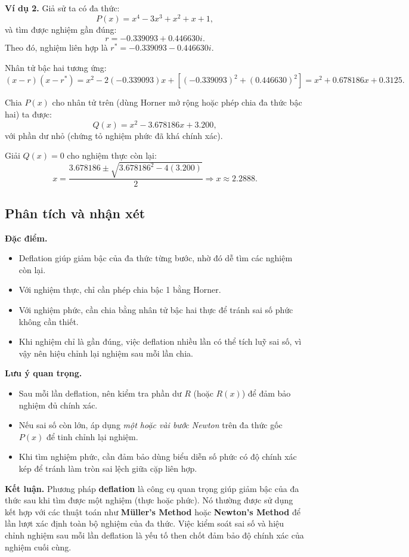 \textbf{Ví dụ 2.}  
Giả sử ta có đa thức:
\[
P(x) = x^4 - 3x^3 + x^2 + x + 1,
\]
và tìm được nghiệm gần đúng:
\[
r = -0.339093 + 0.446630i.
\]
Theo đó, nghiệm liên hợp là $r^* = -0.339093 - 0.446630i$.

Nhân tử bậc hai tương ứng:
\[
(x - r)(x - r^*) = x^2 - 2(-0.339093)x + [(-0.339093)^2 + (0.446630)^2] = x^2 + 0.678186x + 0.3125.
\]

Chia $P(x)$ cho nhân tử trên (dùng Horner mở rộng hoặc phép chia đa thức bậc hai) ta được:
\[
Q(x) = x^2 - 3.678186x + 3.200,
\]
với phần dư nhỏ (chứng tỏ nghiệm phức đã khá chính xác).

Giải $Q(x) = 0$ cho nghiệm thực còn lại:
\[
x = \frac{3.678186 \pm \sqrt{3.678186^2 - 4(3.200)}}{2} \Rightarrow x \approx 2.2888.
\]

\subsection{Phân tích và nhận xét}

\textbf{Đặc điểm.}
\begin{itemize}
    \item Deflation giúp giảm bậc của đa thức từng bước, nhờ đó dễ tìm các nghiệm còn lại.
    \item Với nghiệm thực, chỉ cần phép chia bậc 1 bằng Horner.
    \item Với nghiệm phức, cần chia bằng nhân tử bậc hai thực để tránh sai số phức không cần thiết.
    \item Khi nghiệm chỉ là gần đúng, việc deflation nhiều lần có thể tích luỹ sai số, vì vậy nên hiệu chỉnh lại nghiệm sau mỗi lần chia.
\end{itemize}

\textbf{Lưu ý quan trọng.}
\begin{itemize}
    \item Sau mỗi lần deflation, nên kiểm tra phần dư $R$ (hoặc $R(x)$) để đảm bảo nghiệm đủ chính xác.
    \item Nếu sai số còn lớn, áp dụng \textit{một hoặc vài bước Newton} trên đa thức gốc $P(x)$ để tinh chỉnh lại nghiệm.
    \item Khi tìm nghiệm phức, cần đảm bảo dùng biểu diễn số phức có độ chính xác kép để tránh làm tròn sai lệch giữa cặp liên hợp.
\end{itemize}

\textbf{Kết luận.}  
Phương pháp \textbf{deflation} là công cụ quan trọng giúp giảm bậc của đa thức sau khi tìm được một nghiệm (thực hoặc phức).  
Nó thường được sử dụng kết hợp với các thuật toán như \textbf{Müller’s Method} hoặc \textbf{Newton’s Method} để lần lượt xác định toàn bộ nghiệm của đa thức.  
Việc kiểm soát sai số và hiệu chỉnh nghiệm sau mỗi lần deflation là yếu tố then chốt đảm bảo độ chính xác của nghiệm cuối cùng.